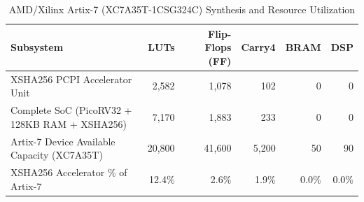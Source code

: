 \begin{table}[htbp]
\centering
\caption{AMD/Xilinx Artix-7 (XC7A35T-1CSG324C) Synthesis and Resource Utilization}
\label{tab:fpga_utilization}
\begin{tabular}{lrrrrr}
\hline
\textbf{Subsystem} & \textbf{LUTs} & \textbf{Flip-Flops (FF)} & \textbf{Carry4} & \textbf{BRAM} & \textbf{DSP} \\
\hline
XSHA256 PCPI Accelerator Unit & 2,582 & 1,078 & 102 & 0 & 0 \\
Complete SoC (PicoRV32 + 128KB RAM + XSHA256) & 7,170 & 1,883 & 233 & 0 & 0 \\
Artix-7 Device Available Capacity (XC7A35T) & 20,800 & 41,600 & 5,200 & 50 & 90 \\
XSHA256 Accelerator \% of Artix-7 & 12.4\% & 2.6\% & 1.9\% & 0.0\% & 0.0\% \\
\hline
\end{tabular}
\end{table}
